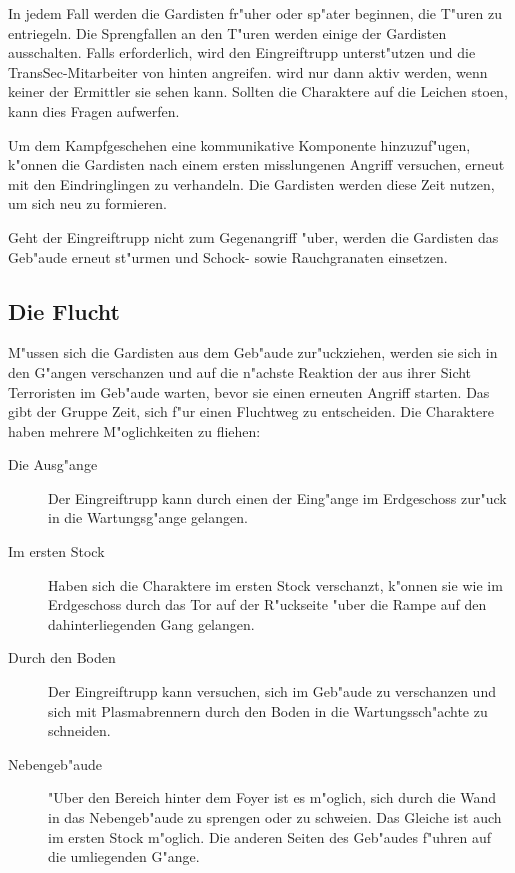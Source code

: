 In jedem Fall werden die Gardisten fr"uher oder sp"ater beginnen, die T"uren zu entriegeln. Die Sprengfallen an den T"uren werden einige der Gardisten ausschalten. Falls erforderlich, wird \xl{} den Eingreiftrupp unterst"utzen und die TransSec-Mitarbeiter von hinten angreifen. \xl{} wird nur dann aktiv werden, wenn keiner der Ermittler sie sehen kann. Sollten die Charaktere auf die Leichen sto\3en, kann dies Fragen aufwerfen.

Um dem Kampfgeschehen eine kommunikative Komponente hinzuzuf"ugen, k"onnen die Gardisten nach einem ersten misslungenen Angriff versuchen, erneut mit den Eindringlingen zu verhandeln. Die Gardisten werden diese Zeit nutzen, um sich neu zu formieren.

Geht der Eingreiftrupp nicht zum Gegenangriff "uber, werden die Gardisten das Geb"aude erneut st"urmen und Schock- sowie Rauchgranaten einsetzen.

\subsection{Die Flucht}
M"ussen sich die Gardisten aus dem Geb"aude zur"uckziehen, werden sie sich in den G"angen verschanzen und auf die n"achste Reaktion der aus ihrer Sicht Terroristen im Geb"aude warten, bevor sie einen erneuten Angriff starten. Das gibt der Gruppe Zeit, sich f"ur einen Fluchtweg zu entscheiden. Die Charaktere haben mehrere M"oglichkeiten zu fliehen:

\begin{description}
	\item [Die Ausg"ange] Der Eingreiftrupp kann durch einen der Eing"ange im Erdgeschoss zur"uck in die Wartungsg"ange gelangen.
	\item [Im ersten Stock] Haben sich die Charaktere im ersten Stock verschanzt, k"onnen sie wie im Erdgeschoss durch das Tor auf der
		R"uckseite "uber die Rampe auf den dahinterliegenden Gang gelangen.
	\item [Durch den Boden] Der Eingreiftrupp kann versuchen, sich im Geb"aude zu verschanzen und sich mit Plasmabrennern durch den Boden in	
		die Wartungssch"achte zu schneiden.
	\item [Nebengeb"aude] "Uber den Bereich hinter dem Foyer ist es m"oglich, sich durch die Wand in das Nebengeb"aude zu sprengen oder zu	
		schwei\3en. Das Gleiche ist auch im ersten Stock m"oglich. Die anderen Seiten des Geb"audes f"uhren auf die umliegenden G"ange.
\end{description}

